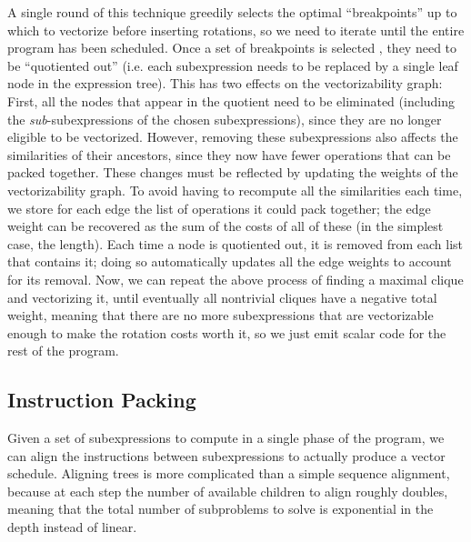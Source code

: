 A single round of this technique greedily selects the optimal ``breakpoints'' up to which to vectorize before inserting rotations, so we need to iterate until the entire program has been scheduled.
Once a set of breakpoints is selected , they need to be ``quotiented out'' (i.e. each subexpression needs to be replaced by a single leaf node in the expression tree).
This has two effects on the vectorizability graph: First, all the nodes that appear in the quotient need to be eliminated (including the {\em sub}-subexpressions of the chosen subexpressions), since they are no longer eligible to be vectorized.
However, removing these subexpressions also affects the similarities of their ancestors, since they now have fewer operations that can be packed together.
These changes must be reflected by updating the weights of the vectorizability graph.
To avoid having to recompute all the similarities each time, we store for each edge the list of operations it could pack together; the edge weight can be recovered as the sum of the costs of all of these (in the simplest case, the length).
Each time a node is quotiented out, it is removed from each list that contains it; doing so automatically updates all the edge weights to account for its removal.
Now, we can repeat the above process of finding a maximal clique and vectorizing it, until eventually all nontrivial cliques have a negative total weight, meaning that there are no more subexpressions that are vectorizable enough to make the rotation costs worth it, so we just emit scalar code for the rest of the program.

\subsection{Instruction Packing}
Given a set of subexpressions to compute in a single phase of the program, we can align the instructions between subexpressions to actually produce a vector schedule.
Aligning trees is more complicated than a simple sequence alignment, because at each step the number of available children to align roughly doubles, meaning that the total number of subproblems to solve is exponential in the depth instead of linear. 

